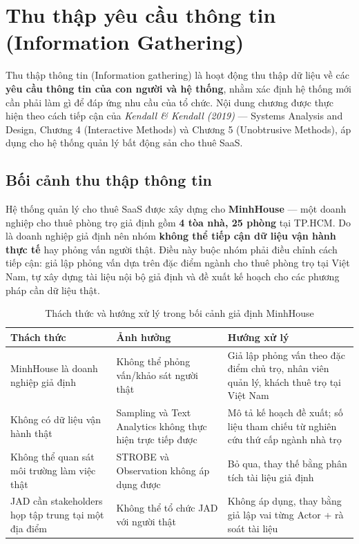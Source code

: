 \documentclass[12pt,a4paper]{report}
\begin{document}
\setcounter{chapter}{1}

\chapter{Thu thập yêu cầu thông tin (Information Gathering)}

Thu thập thông tin (Information gathering) là hoạt động thu thập dữ liệu về các \textbf{yêu cầu thông tin của con người và hệ thống}, nhằm xác định hệ thống mới cần phải làm gì để đáp ứng nhu cầu của tổ chức. Nội dung chương được thực hiện theo cách tiếp cận của \emph{Kendall \& Kendall (2019)} — Systems Analysis and Design, Chương 4 (Interactive Methods) và Chương 5 (Unobtrusive Methods), áp dụng cho hệ thống quản lý bất động sản cho thuê SaaS.

\section{Bối cảnh thu thập thông tin}

Hệ thống quản lý cho thuê SaaS được xây dựng cho \textbf{MinhHouse} — một doanh nghiệp cho thuê phòng trọ giả định gồm \textbf{4 tòa nhà, 25 phòng} tại TP.HCM. Do là doanh nghiệp giả định nên nhóm \textbf{không thể tiếp cận dữ liệu vận hành thực tế} hay phỏng vấn người thật. Điều này buộc nhóm phải điều chỉnh cách tiếp cận: giả lập phỏng vấn dựa trên đặc điểm ngành cho thuê phòng trọ tại Việt Nam, tự xây dựng tài liệu nội bộ giả định và đề xuất kế hoạch cho các phương pháp cần dữ liệu thật.

\begin{table}[H]
  \centering
  \caption{Thách thức và hướng xử lý trong bối cảnh giả định MinhHouse}
  \label{tab:ig_context}
  \begin{tabular}{@{}p{3.6cm}p{5.2cm}p{5.2cm}@{}}
    \toprule
    \textbf{Thách thức} & \textbf{Ảnh hưởng} & \textbf{Hướng xử lý} \\
    \midrule
    MinhHouse là doanh nghiệp giả định & Không thể phỏng vấn/khảo sát người thật & Giả lập phỏng vấn theo đặc điểm chủ trọ, nhân viên quản lý, khách thuê trọ tại Việt Nam \\
    \addlinespace
    Không có dữ liệu vận hành thật & Sampling và Text Analytics không thực hiện trực tiếp được & Mô tả kế hoạch đề xuất; số liệu tham chiếu từ nghiên cứu thứ cấp ngành nhà trọ \\
    \addlinespace
    Không thể quan sát môi trường làm việc thật & STROBE và Observation không áp dụng được & Bỏ qua, thay thế bằng phân tích tài liệu giả định \\
    \addlinespace
    JAD cần stakeholders họp tập trung tại một địa điểm & Không thể tổ chức JAD với người thật & Không áp dụng, thay bằng giả lập vai từng Actor + rà soát tài liệu \\
    \bottomrule
  \end{tabular}
\end{table}
\end{document}
